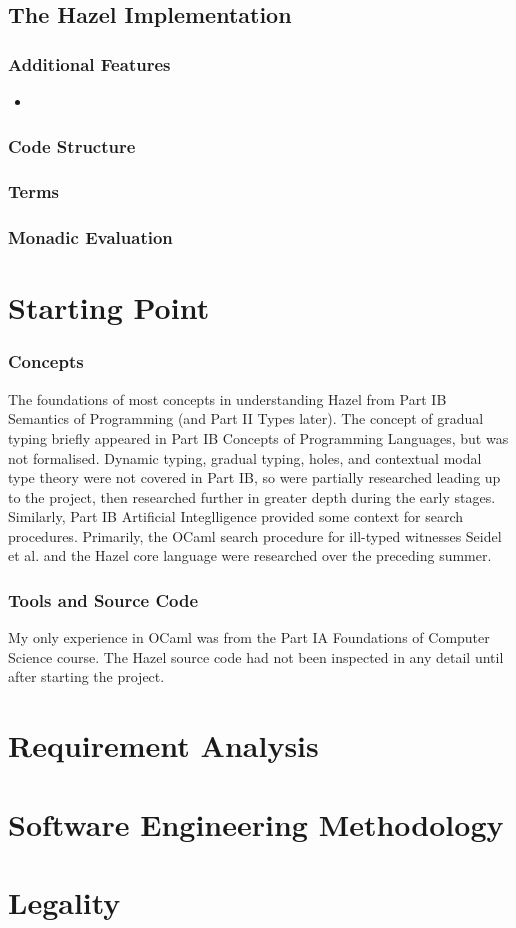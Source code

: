 \subsection{The Hazel Implementation}
\subsubsection{Additional Features}
\begin{itemize}
\item 
\end{itemize}
\subsubsection{Code Structure}

\subsubsection{Terms}

\subsubsection{Monadic Evaluation}


\section{Starting Point}
\subsubsection{Concepts}
The foundations of most concepts in understanding Hazel from Part IB Semantics of Programming (and Part II Types later). The concept of gradual typing briefly appeared in Part IB Concepts of Programming Languages, but was not formalised. Dynamic typing, gradual typing, holes, and contextual modal type theory were not covered in Part IB, so were partially researched leading up to the project, then researched further in greater depth during the early stages. Similarly, Part IB Artificial Integlligence provided some context for search procedures. Primarily, the OCaml search procedure for ill-typed witnesses Seidel et al. \cite{SearchProc} and the Hazel core language \cite{HazelLivePaper} were researched over the preceding summer.

\subsubsection{Tools and Source Code}
My only experience in OCaml was from the Part IA Foundations of Computer Science course. The Hazel source code had not been inspected in any detail until after starting the project.

\section{Requirement Analysis}

\section{Software Engineering Methodology}

\section{Legality}
